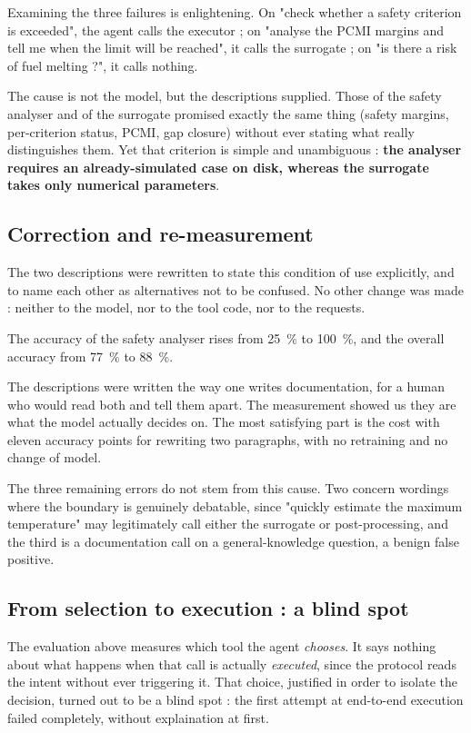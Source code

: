 \documentclass[12pt,a4paper]{report}
\begin{document}
Examining the three failures is enlightening. On "check whether a safety
criterion is exceeded", the agent calls the executor ; on "analyse the PCMI
margins and tell me when the limit will be reached", it calls the surrogate ; on
"is there a risk of fuel melting ?", it calls nothing.

The cause is not the model, but the descriptions supplied. Those of the safety
analyser and of the surrogate promised exactly the same thing (safety margins,
per-criterion status, PCMI, gap closure) without ever stating what really
distinguishes them. Yet that criterion is simple and unambiguous : \textbf{the
analyser requires an already-simulated case on disk, whereas the surrogate takes
only numerical parameters}.

\subsection{Correction and re-measurement}

The two descriptions were rewritten to state this condition of use explicitly,
and to name each other as alternatives not to be confused. No other change was
made : neither to the model, nor to the tool code, nor to the requests.

The accuracy of the safety analyser rises from \SI{25}{\percent} to
\SI{100}{\percent}, and the overall accuracy from \SI{77}{\percent} to
\SI{88}{\percent}.

The descriptions were written the way one writes documentation, for a human
who would read both and tell them apart. The measurement showed us they are what
the model actually decides on. The most satisfying part is the cost with eleven accuracy points for rewriting two
paragraphs, with no retraining and no change of model.

The three remaining errors do not stem from this cause. Two concern wordings
where the boundary is genuinely debatable, since "quickly estimate the maximum
temperature" may legitimately call either the surrogate or post-processing, and the third is a documentation call on a general-knowledge question, a benign
false positive.

\subsection{From selection to execution : a blind spot}
\label{sec:angle-mort}

The evaluation above measures which tool the agent \emph{chooses}. It says
nothing about what happens when that call is actually \emph{executed}, since the
protocol reads the intent without ever triggering it. That choice, justified in
order to isolate the decision, turned out to be a blind spot : the first attempt
at end-to-end execution failed completely, without explaination at first.
\end{document}
